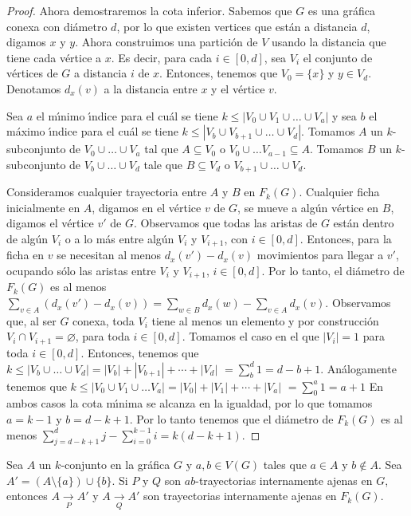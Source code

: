 \begin{proof}
Ahora demostraremos la cota inferior. Sabemos que $G$ es una gr\'afica conexa
con di\'ametro $d$, por lo que existen vertices que est\'an a distancia
$d$, digamos $x$ y $y$. Ahora construimos una partici\'on de $V$ usando  la
distancia que tiene cada v\'ertice a $x$. Es decir, para cada $i\in [0,d]$,
sea $V_{i}$ el conjunto de v\'ertices de $G$ a distancia $i$ de $x$. Entonces,
tenemos que $V_{0}=\{x\}$ y $y\in V_{d}$. Denotamos $d_x(v)$ a la distancia
entre $x$ y el v\'ertice $v$.

Sea $a$ el m\'\i{}nimo \'\i{}ndice para el cu\'al se tiene $k \leq |V_{0}\cup
V_{1}\cup \dots \cup V_{a}|$ y sea $b$ el m\'aximo \'\i{}ndice para el cu\'al se
tiene $k\leq |V_{b}\cup V_{b+1}\cup \dots \cup V_{d}|$. Tomamos $A$ un
$k$-subconjunto de $V_{0}\cup \dots \cup V_{a}$  tal que $A\subseteq
V_{0}$ o $V_{0}\cup \dots V_{a-1}\subseteq A$. Tomamos $B$ un
$k$-subconjunto de $V_{b}\cup \dots \cup V_{d}$ tale que
$B\subseteq V_{d}$ o $V_{b+1}\cup \dots \cup V_{d}$. 

Consideramos cualquier trayectoria entre $A$ y $B$ en $F_{k}(G)$. Cualquier
ficha inicialmente en $A$, digamos en el v\'ertice $v$ de $G$, se mueve a
alg\'un v\'ertice en $B$, digamos el v\'ertice $v'$ de $G$. Observamos que todas
las aristas de $G$ est\'an dentro de alg\'un $V_{i}$ o a lo m\'as entre alg\'un
$V_{i}$ y $V_{i+1}$, con $i\in[0,d]$. Entonces, para la ficha en $v$ se
necesitan al menos $d_x(v')-d_x(v)$ movimientos para llegar a $v'$, ocupando
s\'olo las aristas entre $V_{i}$ y $V_{i+1}$, $i\in [0,d]$. Por lo tanto,
el di\'ametro de $F_{k}(G)$ es al menos $\sum_{v\in A}(d_x(v')-d_x(v))=
\sum_{w\in B}d_x(w)-\sum_{v\in A}d_x(v)$. Observamos que, al ser $G$ conexa,
toda $V_{i}$ tiene al menos un elemento y por construcci\'on $V_{i} \cap
V_{i+1}=\varnothing$, para toda $i\in [0,d]$. Tomamos el caso en el que
$|V_{i}|=1$ para toda $i\in [0,d]$. Entonces, tenemos que $k\leq
|V_{b}\cup\dots\cup V_{d}|=|V_{b}|+|V_{b+1}|+\cdots +|V_d|$
$=\sum_{b}^{d}1 = d -b+1$. An\'alogamente tenemos que $k\leq
|V_{0}\cup V_{1}\cup \dots V_{a}|=|V_{0}|+|V_{1}|+\cdots + |V_{a}|$
$=\sum_{0}^{a} 1 = a+1$ En ambos casos la cota m\'\i{}nima se alcanza en la
igualdad, por lo que tomamos $a=k-1$ y $b=d-k+1$. Por lo tanto tenemos que
el di\'ametro de $F_{k}(G)$ es al menos $\sum_{j=d -k+1}^{d}j -
\sum_{i=0}^{k-1}i = k(d-k+1)$.
\end{proof}


\begin{lema}%
\label{lem:primero}
Sea $A$ un $k$-conjunto en la gr\'afica $G$ y $a, b \in V(G)$ tales que $a \in
A$ y $b \notin A$. Sea $A' = (A \setminus \{ a \}) \cup \{ b \}$. Si $P$ y $Q$
son $ab$-trayectorias internamente ajenas en $G$, entonces $A \xrightarrow[P]{}
A'$ y $A \xrightarrow[Q]{} A'$ son trayectorias internamente ajenas en
$F_{k}(G)$.
\end{lema}

